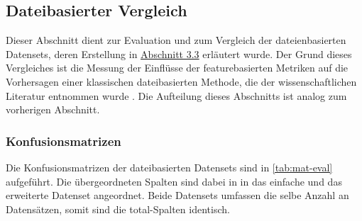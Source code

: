 \subsection{Dateibasierter Vergleich}
\label{classic-eval}

Dieser Abschnitt dient zur Evaluation und zum Vergleich der dateienbasierten Datensets, deren Erstellung in \hyperref[new-datasets]{Abschnitt 3.3} erläutert wurde. Der Grund dieses Vergleiches ist die Messung der Einflüsse der featurebasierten Metriken auf die Vorhersagen einer klassischen dateibasierten Methode, die der wissenschaftlichen Literatur entnommen wurde \cite{Moser2008}. Die Aufteilung dieses Abschnitts ist analog zum vorherigen Abschnitt.

\subsubsection*{Konfusionsmatrizen}

Die Konfusionsmatrizen der dateibasierten Datensets sind in \autoref{tab:mat-eval} aufgeführt. Die übergeordneten Spalten sind dabei in in das \glqq einfache\grqq{} und das erweiterte Datenset angeordnet. Beide Datensets umfassen die selbe Anzahl an Datensätzen, somit sind die \glqq total\grqq -Spalten identisch.

